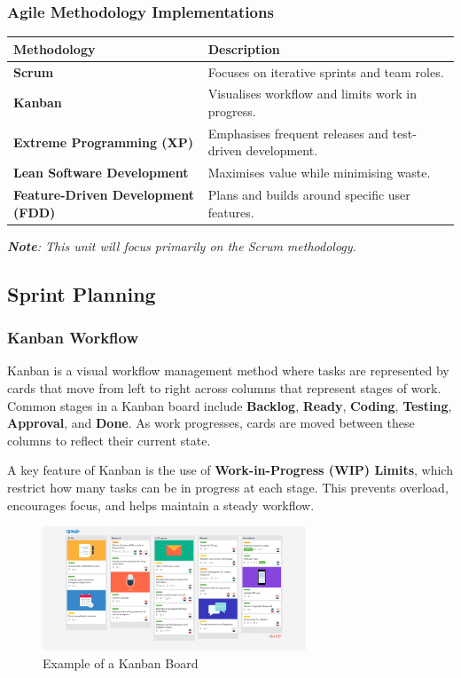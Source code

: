\documentclass{article}
\begin{document}
\subsubsection{Agile Methodology Implementations}
\begin{center}
\begin{tabularx}{\textwidth}{>{\bfseries}l X}
\toprule
Methodology & \textbf{Description} \\
\midrule
Scrum & Focuses on iterative sprints and team roles. \\
Kanban & Visualises workflow and limits work in progress. \\
Extreme Programming (XP) & Emphasises frequent releases and test-driven development. \\
Lean Software Development & Maximises value while minimising waste. \\
Feature-Driven Development (FDD) & Plans and builds around specific user features. \\
\bottomrule
\end{tabularx}
\end{center}

\noindent\textit{\textbf{Note}: This unit will focus primarily on the Scrum methodology.}

\subsection{Sprint Planning}
\subsubsection{Kanban Workflow}

Kanban is a visual workflow management method where tasks are represented by cards that move from left to right across columns that represent stages of work. Common stages in a Kanban board include \textbf{Backlog}, \textbf{Ready}, \textbf{Coding}, \textbf{Testing}, \textbf{Approval}, and \textbf{Done}. As work progresses, cards are moved between these columns to reflect their current state.

A key feature of Kanban is the use of \textbf{Work-in-Progress (WIP) Limits}, which restrict how many tasks can be in progress at each stage. This prevents overload, encourages focus, and helps maintain a steady workflow.

\begin{figure}[h]
    \centering
    \includegraphics[width=0.7\textwidth]{kanban.jpg}
    \caption{Example of a Kanban Board}
    \label{fig:kanban}
\end{figure}
\end{document}
